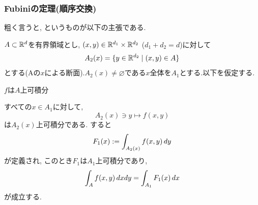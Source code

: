 \subsubsection{Fubiniの定理(順序交換)}
粗く言うと, というものが以下の主張である.
\begin{theo}
$A\subset \mathbb{R}^{d}$を有界領域とし, $(x,y)\in \mathbb{R}^{d_1} \times \mathbb{R}^{d_2}$ ($d_1+d_2 = d$)に対して
\[A_2(x) = \{ y\in \mathbb{R}^{d_2} \mid (x,y)\in A\}\]
とする(Aの$x$による断面).$A_2(x)\neq\varnothing$である$x$全体を$A_1$とする.以下を仮定する.
\ben
\item $f$は$A$上可積分
\item すべての$x\in A_1$に対して,
\[A_2(x)\ni y\mapsto f(x,y)\]
は$A_2(x)$上可積分である.
\een
すると
\[F_1(x) := \displaystyle\int_{A_2(x)} f(x,y)\, dy\]
が定義され, このとき$F_1$は$A_1$上可積分であり,
\[\displaystyle\int_{A} f(x,y) \, dxdy = \displaystyle\int_{A_1} F_1(x)\, dx\]
が成立する.
\end{theo}



